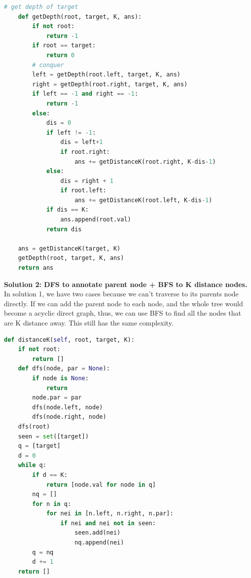 \documentclass[../main.tex]{subfiles}
\begin{document}
\begin{examples}[resume]
\begin{lstlisting}[language=Python]
    # get depth of target
    def getDepth(root, target, K, ans):
        if not root:
            return -1
        if root == target:
            return 0
        # conquer
        left = getDepth(root.left, target, K, ans)
        right = getDepth(root.right, target, K, ans)
        if left == -1 and right == -1:
            return -1
        else:
            dis = 0
            if left != -1:
                dis = left+1
                if root.right:
                    ans += getDistanceK(root.right, K-dis-1)
            else:
                dis = right + 1
                if root.left:
                    ans += getDistanceK(root.left, K-dis-1)
            if dis == K:
                ans.append(root.val)
            return dis
        
    ans = getDistanceK(target, K)
    getDepth(root, target, K, ans)
    return ans
\end{lstlisting}
\textbf{Solution 2: DFS to annotate parent node + BFS to K distance nodes.} In solution 1, we have two cases because we can't traverse to its parents node directly. If we can add the parent node to each node, and the whole tree would become a acyclic direct graph, thus, we can use BFS to find all the nodes that are K distance away. This still has the same complexity.
\begin{lstlisting}[language=Python]
def distanceK(self, root, target, K):
    if not root:
        return []
    def dfs(node, par = None):
        if node is None:
            return
        node.par = par
        dfs(node.left, node)
        dfs(node.right, node)
    dfs(root)
    seen = set([target])
    q = [target]
    d = 0
    while q:
        if d == K:
            return [node.val for node in q]
        nq = []
        for n in q:
            for nei in [n.left, n.right, n.par]:
                if nei and nei not in seen:
                    seen.add(nei)
                    nq.append(nei)
        q = nq
        d += 1
    return []
\end{lstlisting}
\end{examples}




\end{document}
